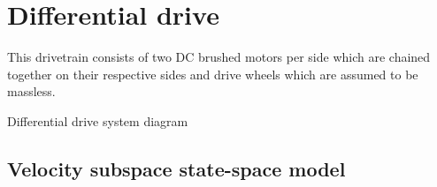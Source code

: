 \section{Differential drive}
\label{sec:ss_model_differential_drive}

This drivetrain consists of two DC brushed motors per side which are chained
together on their respective sides and drive wheels which are assumed to be
massless.
\begin{bookfigure}
  
  \caption{Differential drive system diagram}
\end{bookfigure}

\subsection{Velocity subspace state-space model}

